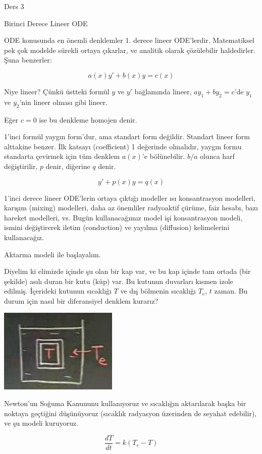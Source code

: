 \documentclass[12pt,fleqn]{article}\usepackage{../../common}
\begin{document}
Ders 3

Birinci Derece Lineer ODE

ODE konusunda en önemli denklemler 1. derece lineer
ODE'lerdir. Matematiksel pek çok modelde sürekli ortaya çıkarlar, ve
analitik olarak çözülebilir haldedirler. Şuna benzerler:

$$ a(x)y' + b(x)y = c(x) $$

Niye lineer? Çünkü üstteki formül $y$ ve $y'$ bağlamında lineer, 
$ay_1 + by_2 = c$'de $y_1$ ve $y_2$'nin lineer olması gibi lineer.

Eğer $c = 0$ ise bu denkleme homojen denir. 

1'inci formül yaygın form'dur, ama standart form değildir. Standart lineer
form alttakine benzer. İlk katsayı (coefficient) 1 değerinde olmalıdır,
yaygın formu standarta çevirmek için tüm denklem $a(x)$'e
bölünebilir. $b/a$ olunca harf değiştirilir, $p$ denir, diğerine $q$ denir.

$$ y' + p(x)y = q(x) $$

1'inci derece lineer ODE'lerin ortaya çıktığı modeller ısı konsantrasyon
modelleri, karışım (mixing) modelleri, daha az önemliler radyoaktif çürüme,
faiz hesabı, bazı hareket modelleri, vs. Bugün kullanacağımız model işi
konsantrasyon modeli, ismini değiştirerek iletim (conduction) ve yayılma
(diffusion) kelimelerini kullanacağız.

Aktarma modeli ile başlayalım. 

Diyelim ki elimizde içinde şu olan bir kap var, ve bu kap içinde tam ortada
(bir şekilde) asılı duran bir kutu (küp) var. Bu kutunun duvarları kısmen
izole edilmiş. İçerideki kutunun sıcaklığı $T$ ve dış bölmenin sıcaklığı
$T_e$, $t$ zaman. Bu durum için nasıl bir diferansiyel denklem kurarız?

\includegraphics[height=4cm]{3_1.png}

Newton'un Soğuma Kanununu kullanıyoruz ve sıcaklığın aktarılarak başka bir
noktaya geçtiğini düşünüyoruz (sıcaklık radyasyon üzerinden de seyahat
edebilir), ve şu modeli kuruyoruz.

$$ \frac{dT}{dt} = k(T_e - T) $$
\end{document}
